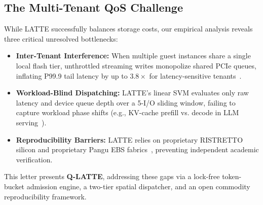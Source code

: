 \documentclass[lettersize,journal]{IEEEtran}
\begin{document}
\subsection{The Multi-Tenant QoS Challenge}
While LATTE successfully balances storage costs, our empirical analysis reveals three critical unresolved bottlenecks:
\begin{itemize}
    \item \textbf{Inter-Tenant Interference:} When multiple guest instances share a single local flash tier, unthrottled streaming writes monopolize shared PCIe queues, inflating P99.9 tail latency by up to $3.8\times$ for latency-sensitive tenants~\cite{dean2013tail}.
    \item \textbf{Workload-Blind Dispatching:} LATTE's linear SVM evaluates only raw latency and device queue depth over a 5-I/O sliding window, failing to capture workload phase shifts (e.g., KV-cache prefill vs. decode in LLM serving~\cite{wong2024baleen}).
    \item \textbf{Reproducibility Barriers:} LATTE relies on proprietary RISTRETTO silicon and proprietary Pangu EBS fabrics~\cite{zhang2024ebs}, preventing independent academic verification.
\end{itemize}

This letter presents \textbf{Q-LATTE}, addressing these gaps via a lock-free token-bucket admission engine, a two-tier spatial dispatcher, and an open commodity reproducibility framework.

\begin{table}[t]
\centering
\caption{Comparison Across Cloud Local Storage Generations~\cite{yang2026here}}
\label{tab:comparison}
\end{table}
\end{document}
